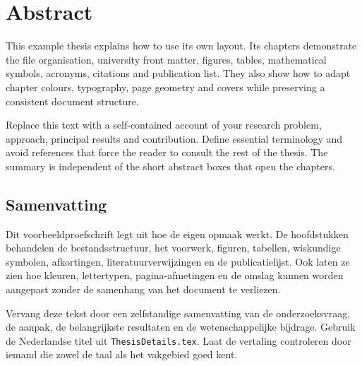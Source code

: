 
\chapter*{Abstract}
\noindent\textbf{\thesistitle}\par
\noindent\textit{\thesissubtitle}\par\bigskip
This example thesis explains how to use its own layout. Its chapters demonstrate
the file organisation, university front matter, figures, tables, mathematical
symbols, acronyms, citations and publication list. They also show how to adapt
chapter colours, typography, page geometry and covers while preserving a
consistent document structure.

Replace this text with a self-contained account of your research problem,
approach, principal results and contribution. Define essential terminology and
avoid references that force the reader to consult the rest of the thesis.
The summary is independent of the short abstract boxes that open the chapters.

\begin{otherlanguage}{dutch}
\chapter*{Samenvatting}
\noindent\textbf{\thesistitleDutch}\par
\noindent\textit{\thesissubtitleDutch}\par\bigskip
Dit voorbeeldproefschrift legt uit hoe de eigen opmaak werkt. De hoofdstukken
behandelen de bestandsstructuur, het voorwerk, figuren, tabellen, wiskundige
symbolen, afkortingen, literatuurverwijzingen en de publicatielijst. Ook laten ze
zien hoe kleuren, lettertypen, pagina-afmetingen en de omslag kunnen worden
aangepast zonder de samenhang van het document te verliezen.

Vervang deze tekst door een zelfstandige samenvatting van de onderzoeksvraag,
de aanpak, de belangrijkste resultaten en de wetenschappelijke bijdrage.
Gebruik de Nederlandse titel uit \texttt{ThesisDetails.tex}. Laat de vertaling
controleren door iemand die zowel de taal als het vakgebied goed kent.
\end{otherlanguage}
